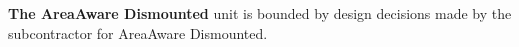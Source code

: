 \noindent \textbf{The AreaAware Dismounted} unit is bounded by design decisions made by the subcontractor for AreaAware Dismounted.
